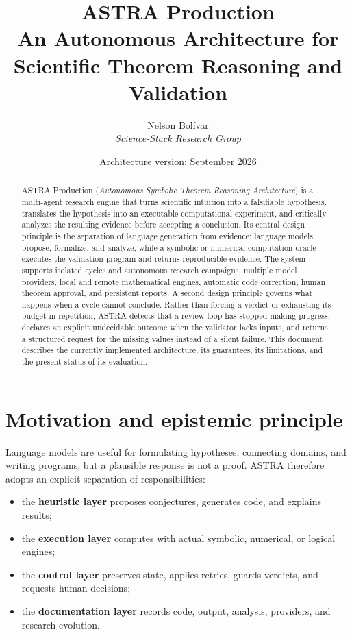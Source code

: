 \documentclass[11pt,a4paper]{article}
\title{\textbf{ASTRA Production}\\[2mm]
\large An Autonomous Architecture for Scientific Theorem Reasoning and Validation}
\author{Nelson Bolívar\\\textit{Science-Stack Research Group}}
\date{Architecture version: September 2026}
\begin{document}
\maketitle

\begin{abstract}
ASTRA Production (\textit{Autonomous Symbolic Theorem Reasoning Architecture}) is a multi-agent research engine that turns scientific intuition into a falsifiable hypothesis, translates the hypothesis into an executable computational experiment, and critically analyzes the resulting evidence before accepting a conclusion. Its central design principle is the separation of language generation from evidence: language models propose, formalize, and analyze, while a symbolic or numerical computation oracle executes the validation program and returns reproducible evidence. The system supports isolated cycles and autonomous research campaigns, multiple model providers, local and remote mathematical engines, automatic code correction, human theorem approval, and persistent reports. A second design principle governs what happens when a cycle cannot conclude. Rather than forcing a verdict or exhausting its budget in repetition, ASTRA detects that a review loop has stopped making progress, declares an explicit undecidable outcome when the validator lacks inputs, and returns a structured request for the missing values instead of a silent failure. This document describes the currently implemented architecture, its guarantees, its limitations, and the present status of its evaluation.
\end{abstract}

\section{Motivation and epistemic principle}

Language models are useful for formulating hypotheses, connecting domains, and writing programs, but a plausible response is not a proof. ASTRA therefore adopts an explicit separation of responsibilities:

\begin{itemize}
  \item the \textbf{heuristic layer} proposes conjectures, generates code, and explains results;
  \item the \textbf{execution layer} computes with actual symbolic, numerical, or logical engines;
  \item the \textbf{control layer} preserves state, applies retries, guards verdicts, and requests human decisions;
  \item the \textbf{documentation layer} records code, output, analysis, providers, and research evolution.
\end{itemize}
\end{document}
